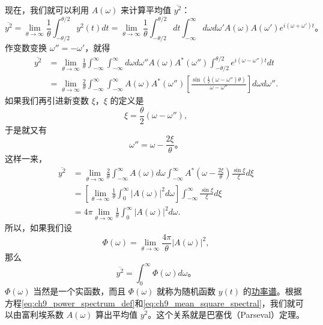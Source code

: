 现在，我们就可以利用 $ A(\omega) $ 来计算平均值 $ \overline{y^2} $：
\begin{equation*}
\overline{y^2} = \lim_{\theta \to \infty} \frac{1}{\theta} \int_{-\theta/2}^{\theta/2} y^2(t) dt = \lim_{\theta \to \infty} \frac{1}{\theta} \int_{-\theta/2}^{\theta/2} dt \int_{-\infty}^{\infty} d\omega d\omega' A(\omega) A(\omega') e^{i(\omega + \omega')t}。
\end{equation*}
作变数变换 $ \omega'' = -\omega' $，就得
\begin{align*}
\overline{y^2} &= \lim_{\theta \to \infty} \frac{1}{\theta} \int_{-\infty}^{\infty} \int_{-\infty}^{\infty} d\omega d\omega'' A(\omega) A^* (\omega'') \int_{-\theta/2}^{\theta/2} e^{i(\omega - \omega'')t} dt\\
&= \lim_{\theta \to \infty} \frac{2}{\theta} \int_{-\infty}^{\infty} \int_{-\infty}^{\infty} A(\omega) A^* (\omega'') \left[ \frac{\sin \left( \frac{1}{2} (\omega - \omega'') \theta \right)}{\omega - \omega''} \right] d\omega d\omega''.
\end{align*}
如果我们再引进新变数 $ \xi $，$ \xi $ 的定义是
\[
\xi = \frac{\theta}{2} (\omega - \omega''),
\]
于是就又有
\[
\omega'' = \omega - \frac{2\xi}{\theta}。
\]
这样一来，
\begin{align*}
\overline{y^2} &= \lim_{\theta \to \infty} \frac{2}{\theta} \int_{-\infty}^{\infty} A(\omega) d\omega \int_{-\infty}^{\infty} A^* (\omega - \frac{2\xi}{\theta}) \frac{\sin \xi}{\xi} d\xi\\
&= \left[ \lim_{\theta \to \infty} \frac{1}{\theta} \int_{0}^{\infty} |A(\omega)|^2 d\omega \right] \int_{-\infty}^{\infty} \frac{\sin \xi}{\xi} d\xi\\
&= 4\pi \lim_{\theta \to \infty} \frac{1}{\theta} \int_{0}^{\infty} |A(\omega)|^2 d\omega.
\end{align*}
所以，如果我们设
\begin{equation}\label{eq:ch9_power_spectrum_def}
\Phi(\omega) = \lim_{\theta \to \infty} \frac{4\pi}{\theta} |A(\omega)|^2,
\end{equation}
那么
\begin{equation}\label{eq:ch9_mean_square_spectral}
\overline{y^2} = \int_{0}^{\infty} \Phi(\omega) d\omega。
\end{equation}
$ \Phi(\omega) $ 当然是一个实函数，而且 $ \Phi(\omega) $ 就称为随机函数 $ y(t) $ 的\underline{功率谱}。根据方程\eqref{eq:ch9_power_spectrum_def}和\eqref{eq:ch9_mean_square_spectral}，我们就可以由富利埃系数 $ A(\omega) $ 算出平均值 $ \overline{y^2} $。这个关系就是巴塞伐（Parseval）定理。

